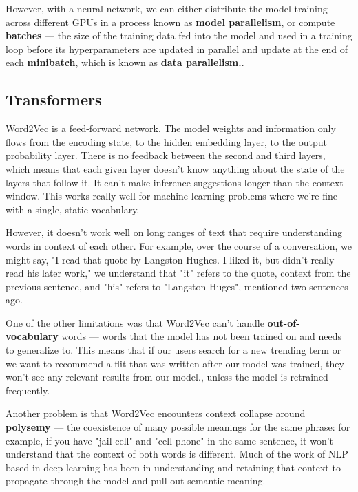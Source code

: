 \documentclass[11pt, table]{diazessay} %
\begin{document}
\begin{sloppypar}
However, with a neural network, we can either distribute the model training across different GPUs in a process known as \textbf{model parallelism}, or compute \textbf{batches} --- the size of the training data fed into the model and used in a training loop before its hyperparameters are updated in parallel and update at the end of each \textbf{minibatch}, which is known as \textbf{data parallelism.}\citep{shallue2018measuring}.


\subsection{Transformers}

Word2Vec is a feed-forward network. The model weights and information only flows from the encoding state, to the hidden embedding layer, to the output probability layer. There is no feedback between the second and third layers, which means that each given layer doesn't know anything about the state of the layers that follow it. It can't make inference suggestions longer than the context window. This works really well for machine learning problems where we're fine with a single, static vocabulary.

However, it doesn't work well on long ranges of text that require understanding words in context of each other. For example, over the course of a conversation, we might say, "I read that quote by Langston Hughes. I liked it, but didn't really read his later work," we understand that "it" refers to the quote, context from the previous sentence, and "his" refers to "Langston Huges", mentioned two sentences ago.

One of the other limitations was that Word2Vec can't handle \textbf{out-of-vocabulary} words --- words that the model has not been trained on and needs to generalize to. This means that if our users search for a new trending term or we want to recommend a flit that was written after our model was trained, they won't see any relevant results from our model.\citep{di2021considerations}, unless the model is retrained frequently.

Another problem is that Word2Vec encounters context collapse around \textbf{polysemy} --- the coexistence of many possible meanings for the same phrase: for example, if you have "jail cell" and "cell phone" in the same sentence, it won't understand that the context of both words is different. Much of the work of NLP based in deep learning has been in understanding and retaining that context to propagate through the model and pull out semantic meaning.   


\end{sloppypar}
\end{document}
